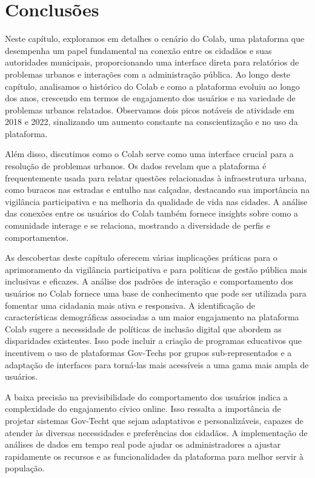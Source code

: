 \section{Conclusões}
Neste capítulo, exploramos em detalhes o cenário do Colab, uma plataforma que desempenha um papel fundamental na conexão entre os cidadãos e suas autoridades municipais, proporcionando uma interface direta para relatórios de problemas urbanos e interações com a administração pública. Ao longo deste capítulo, analisamos o histórico do Colab e como a plataforma evoluiu ao longo dos anos, crescendo em termos de engajamento dos usuários e na variedade de problemas urbanos relatados. Observamos dois picos notáveis de atividade em 2018 e 2022, sinalizando um aumento constante na conscientização e no uso da plataforma.

Além disso, discutimos como o Colab serve como uma interface crucial para a resolução de problemas urbanos. Os dados revelam que a plataforma é frequentemente usada para relatar questões relacionadas à infraestrutura urbana, como buracos nas estradas e entulho nas calçadas, destacando sua importância na vigilância participativa e na melhoria da qualidade de vida nas cidades. A análise das conexões entre os usuários do Colab também fornece insights sobre como a comunidade interage e se relaciona, mostrando a diversidade de perfis e comportamentos.

As descobertas deste capítulo oferecem várias implicações práticas para o aprimoramento da vigilância participativa e para políticas de gestão pública mais inclusivas e eficazes. A análise dos padrões de interação e comportamento dos usuários no Colab fornece uma base de conhecimento que pode ser utilizada para fomentar uma cidadania mais ativa e responsiva. A identificação de características demográficas associadas a um maior engajamento na plataforma Colab sugere a necessidade de políticas de inclusão digital que abordem as disparidades existentes. Isso pode incluir a criação de programas educativos que incentivem o uso de plataformas Gov-Techs por grupos sub-representados e a adaptação de interfaces para torná-las mais acessíveis a uma gama mais ampla de usuários.

A baixa precisão na previsibilidade do comportamento dos usuários indica a complexidade do engajamento cívico online. Isso ressalta a importância de projetar sistemas Gov-Techt que sejam adaptativos e personalizáveis, capazes de atender às diversas necessidades e preferências dos cidadãos. A implementação de análises de dados em tempo real pode ajudar os administradores a ajustar rapidamente os recursos e as funcionalidades da plataforma para melhor servir à população.

